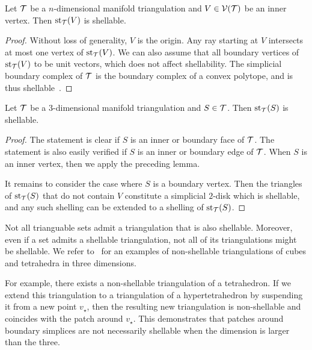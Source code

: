 \documentclass[12pt,a4paper]{article}
\begin{document}
\begin{lemma}
    Let ${\mathcal T}$ be a $n$-dimensional manifold triangulation and $V \in {\mathcal V}({\mathcal T})$ be an inner vertex.
    Then $\operatorname{st}_{{\mathcal T}}(V)$ is shellable. 
\end{lemma}
\begin{proof}
    Without loss of generality, $V$ is the origin. 
    Any ray starting at $V$ intersects at most one vertex of $\operatorname{st}_{{\mathcal T}}(V)$.
    We can also assume that all boundary vertices of $\operatorname{st}_{{\mathcal T}}(V)$ to be unit vectors,
    which does not affect shellability. 
    The simplicial boundary complex of ${\mathcal T}$ is the boundary complex of a convex polytope,
    and is thus shellable~\cite[Theorem~8.12]{ziegler2012lectures}. 
\end{proof}


\begin{lemma}
    Let ${\mathcal T}$ be a $3$-dimensional manifold triangulation and $S \in {\mathcal T}$.
    Then $\operatorname{st}_{{\mathcal T}}(S)$ is shellable. 
\end{lemma}
\begin{proof}
    The statement is clear if $S$ is an inner or boundary face of ${\mathcal T}$. 
    The statement is also easily verified if $S$ is an inner or boundary edge of ${\mathcal T}$.
    When $S$ is an inner vertex, then we apply the preceding lemma. 
    
    It remains to consider the case where $S$ is a boundary vertex. 
    Then the triangles of $\operatorname{st}_{{\mathcal T}}(S)$ that do not contain $V$ constitute a simplicial $2$-disk 
    which is shellable,
    and any such shelling can be extended to a shelling of $\operatorname{st}_{{\mathcal T}}(S)$.
\end{proof}


\begin{remark}
    Not all trianguable sets admit a triangulation that is also shellable. 
    Moreover, even if a set admits a shellable triangulation, not all of its triangulations might be shellable. 
    We refer to~\cite[Example 8.9]{ziegler2012lectures} for an examples of non-shellable triangulations of cubes and tetrahedra in three dimensions. 

    For example, there exists a non-shellable triangulation of a tetrahedron. 
    If we extend this triangulation to a triangulation of a hypertetrahedron by suspending it from a new point $v_\star$, 
    then the resulting new triangulation is non-shellable and coincides with the patch around $v_\star$.
    This demonstrates that patches around boundary simplices are not necessarily shellable when the dimension is larger than the three.
\end{remark}
\end{document}
